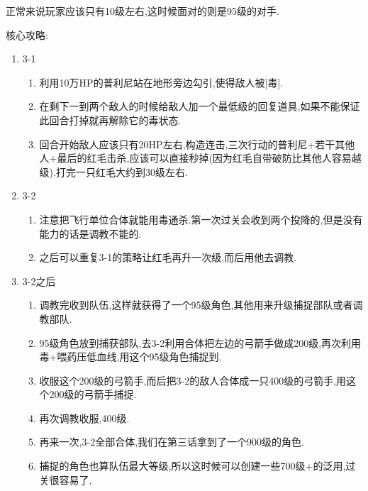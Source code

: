 	正常来说玩家应该只有10级左右,这时候面对的则是95级的对手.

	核心攻略:

	\begin{enumerate}
		\item{3-1}
			\begin{enumerate}
			\item 利用10万HP的普利尼站在地形旁边勾引,使得敌人被[毒].

			\item 在剩下一到两个敌人的时候给敌人加一个最低级的回复道具,如果不能保证此回合打掉就再解除它的毒状态.

			\item 回合开始敌人应该只有20HP左右,构造连击,三次行动的普利尼+若干其他人+最后的红毛击杀,应该可以直接秒掉(因为红毛自带破防比其他人容易越级).打完一只红毛大约到30级左右.
			\end{enumerate}

		\item{3-2}
			\begin{enumerate}
				\item 注意把飞行单位合体就能用毒通杀.第一次过关会收到两个投降的,但是没有能力的话是调教不能的.

				\item 之后可以重复3-1的策略让红毛再升一次级,而后用他去调教.

			\end{enumerate}
		
		\item{3-2之后}
			\begin{enumerate}

				\item 调教完收到队伍,这样就获得了一个95级角色,其他用来升级捕捉部队或者调教部队.

				\item 95级角色放到捕获部队,去3-2利用合体把左边的弓箭手做成200级,再次利用毒+喂药压低血线,用这个95级角色捕捉到.

				\item 收服这个200级的弓箭手,而后把3-2的敌人合体成一只400级的弓箭手,用这个200级的弓箭手捕捉.

				\item 再次调教收服,400级.

				\item 再来一次,3-2全部合体,我们在第三话拿到了一个900级的角色.

				\item 捕捉的角色也算队伍最大等级,所以这时候可以创建一些700级+的泛用,过关很容易了.

			\end{enumerate}				
	

		\end{enumerate}
	
